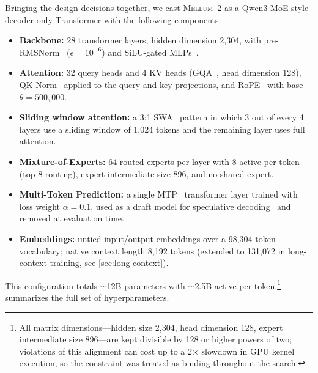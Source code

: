 \documentclass{llmxive}
\providecommand{\modelname}{\textsc{Mellum~2}\xspace}
\begin{document}
Bringing the design decisions together, we cast \modelname as a Qwen3-MoE-style
decoder-only Transformer with the following components:

\enlargethispage{2\baselineskip}
\begin{itemize}[itemsep=2pt,topsep=4pt,parsep=0pt]
  \item \textbf{Backbone:} 28 transformer layers, hidden dimension 2{,}304, with
    pre-RMSNorm~\cite{zhang2019rmsnorm} ($\epsilon = 10^{-6}$) and SiLU-gated MLPs~\cite{shazeer2020glu}.
  \item \textbf{Attention:} 32 query heads and 4 KV heads (GQA~\cite{ainslie2023gqa}, head
    dimension 128), QK-Norm~\cite{henry2020qknorm} applied to the query and key projections, and RoPE~\cite{su2024roformer}
    with base $\theta = 500{,}000$.
  \item \textbf{Sliding window attention:} a 3:1 SWA~\cite{beltagy2020longformer} pattern in which 3 out of
    every 4 layers use a sliding window of 1{,}024 tokens and the remaining
    layer uses full attention.
  \item \textbf{Mixture-of-Experts:} 64 routed experts per layer with 8 active
    per token (top-8 routing), expert intermediate size 896, and no shared
    expert.
  \item \textbf{Multi-Token Prediction:} a single MTP~\cite{gloeckle2024mtp} transformer layer trained
    with loss weight $\alpha = 0.1$, used as a draft model for speculative
    decoding~\cite{leviathan2023speculative} and removed at evaluation time.
  \item \textbf{Embeddings:} untied input/output embeddings over a 98{,}304-token
    vocabulary; native context length 8{,}192 tokens (extended to 131{,}072 in
    long-context training, see \cref{sec:long-context}).
\end{itemize}

This configuration totals ${\sim}$12B parameters with ${\sim}$2.5B active per
token.\footnote{All matrix dimensions---hidden size 2{,}304, head dimension 128,
expert intermediate size 896---are kept divisible by 128 or higher powers of
two; violations of this alignment can cost up to a 2$\times$ slowdown in GPU
kernel execution, so the constraint was treated as binding throughout the
search.}
 summarizes the full set of hyperparameters.
\end{document}
